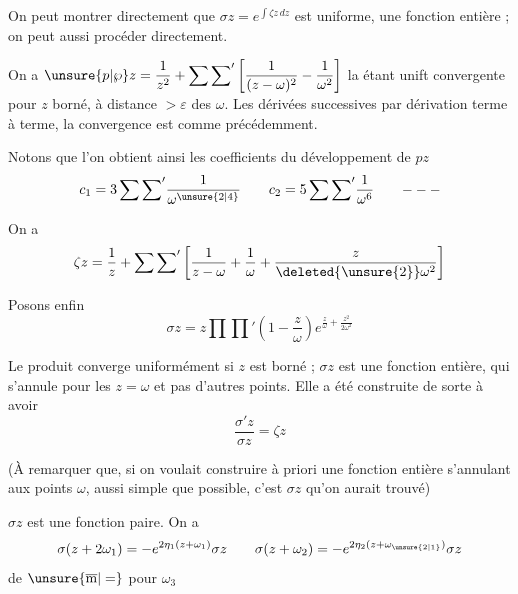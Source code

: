 On peut montrer directement que $\sigma z=e^{\int\zeta z\,dz}$ est uniforme,   une fonction entière ;  on peut aussi procéder directement.

On a  $\displaystyle\unsure{p|\wp}z=\frac1{z^2}+\sum{\sum}'\left[\frac1{(z-\omega)^2}-\frac1{\omega^2}\right]$ la  étant unift convergente pour $z$ borné, à distance $>\varepsilon$ des $\omega$. Les dérivées successives  par dérivation terme à terme, la convergence est comme précédemment.

Notons que l'on obtient ainsi les coefficients du développement de $pz$
\[
c_1=3\sum{\sum}'\frac1{\omega^{\unsure{2|4}}}\qquad c_2=5\sum{\sum}'\frac1{\omega^6}\qquad\mathord{---}
\]

On a
\[
\zeta z=\frac1z+\sum{\sum}'\left[\frac1{z-\omega}+\frac1\omega+\frac{z}{\deleted{\unsure{2}}\omega^2}\right]
\]

Posons enfin
\[
\sigma z=z\prod{\prod}'\left(1-\frac z\omega\right)e^{\frac z\omega+\frac{z^2}{2\omega^2}}
\]

Le produit converge  uniformément  si $z$ est borné ; $\sigma z$ est une fonction entière, qui s'annule pour les $z=\omega$ et pas d'autres points. Elle a été construite de sorte à avoir
\[
\frac{\sigma'z}{\sigma z}=\zeta z
\]

(À remarquer que, si on voulait construire à priori une fonction entière s'annulant aux points $\omega$, aussi simple que possible, c'est $\sigma z$ qu'on aurait trouvé)

$\sigma z$ est une fonction paire. On a
\[
\sigma(z+2\omega_1)=-e^{2\eta_1(z+\omega_1)}\sigma z\qquad
\sigma(z+\omega_2)=-e^{2\eta_2(z+\omega_{\unsure{2|1}})}\sigma z
\]
de $\unsure{\overline{\mathrm m}|=}$ pour $\omega_3$

